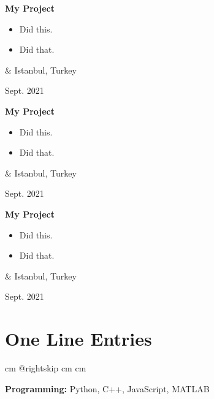 \documentclass[10pt, letterpaper]{article}
\newenvironment{highlights}{
        \begin{itemize}[
                topsep=0pt,
                parsep=0.10 cm,
                partopsep=0pt,
                itemsep=0pt,
                after=\vspace{-1\baselineskip},
                leftmargin=0.4 cm + 3pt
            ]
    }{
        \end{itemize}
    } %
\let\originalTabularx\tabularx
\let\originalEndTabularx\endtabularx
\renewenvironment{tabularx}{\bgroup\centering\originalTabularx}{\originalEndTabularx\par\egroup}
\begin{document}
        \vspace{0.2 cm}
        \begin{tabularx}{
            \textwidth-0.4 cm-0.13cm
        }{
            K{0.2 cm}
            R{4.1 cm}
        }
            \textbf{My Project}

            \vspace{0.10 cm}

            \begin{highlights}
                \item Did this.
                \item Did that.
            \end{highlights}
            &
            Istanbul, Turkey

            Sept. 2021
        \end{tabularx}


        \vspace{0.2 cm}
        \begin{tabularx}{
            \textwidth-0.4 cm-0.13cm
        }{
            K{0.2 cm}
            R{4.1 cm}
        }
            \textbf{My Project}

            \vspace{0.10 cm}

            \begin{highlights}
                \item Did this.
                \item Did that.
            \end{highlights}
            &
            Istanbul, Turkey

            Sept. 2021
        \end{tabularx}


        \vspace{0.2 cm}
        \begin{tabularx}{
            \textwidth-0.4 cm-0.13cm
        }{
            K{0.2 cm}
            R{4.1 cm}
        }
            \textbf{My Project}

            \vspace{0.10 cm}

            \begin{highlights}
                \item Did this.
                \item Did that.
            \end{highlights}
            &
            Istanbul, Turkey

            Sept. 2021
        \end{tabularx}



    
    \section{One Line Entries}

        \begingroup{} cm
        \advance\csname @rightskip cm
        \advance{} cm

        \textbf{Programming:} Python, C++, JavaScript, MATLAB
        \par\endgroup


    
\end{document}
